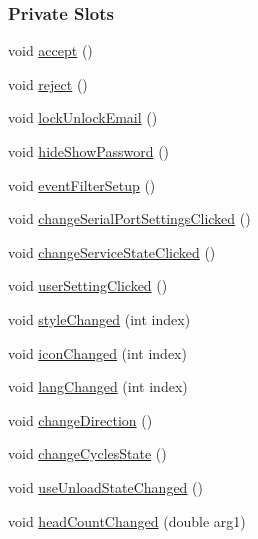 \subsubsection*{Private Slots}
\begin{DoxyCompactItemize}
\item 
void \mbox{\hyperlink{classGeneralSettingDialog_a8f189ce9494b6c5488f8a2be4c792f6a}{accept}} ()
\item 
void \mbox{\hyperlink{classGeneralSettingDialog_a2f4495a0f2911e41d3eaeec00949bde8}{reject}} ()
\item 
void \mbox{\hyperlink{classGeneralSettingDialog_a53e28908636048d815628b85dcaaca4c}{lock\+Unlock\+Email}} ()
\item 
void \mbox{\hyperlink{classGeneralSettingDialog_a15e7d8a20dbb83ea3ee46dd57446ec36}{hide\+Show\+Password}} ()
\item 
void \mbox{\hyperlink{classGeneralSettingDialog_aafd1047488eb1f024f0b572a95c454ad}{event\+Filter\+Setup}} ()
\item 
void \mbox{\hyperlink{classGeneralSettingDialog_afd7ce89c9dde6f411472da4e413475ec}{change\+Serial\+Port\+Settings\+Clicked}} ()
\item 
void \mbox{\hyperlink{classGeneralSettingDialog_ad5275b9ede5252e57d4b6a44eb771a04}{change\+Service\+State\+Clicked}} ()
\item 
void \mbox{\hyperlink{classGeneralSettingDialog_abfa33957c880ab0172b2ee30e848f6bd}{user\+Setting\+Clicked}} ()
\item 
void \mbox{\hyperlink{classGeneralSettingDialog_ac250bc3aba6c2e247d26f5ece4b32af7}{style\+Changed}} (int index)
\item 
void \mbox{\hyperlink{classGeneralSettingDialog_a6907e319fa3cedb66f4645cd0f3ad676}{icon\+Changed}} (int index)
\item 
void \mbox{\hyperlink{classGeneralSettingDialog_a80bce87bcafdf14692465fc5ae181a4c}{lang\+Changed}} (int index)
\item 
void \mbox{\hyperlink{classGeneralSettingDialog_a67274a86c828985ee88c055de4d2bce5}{change\+Direction}} ()
\item 
void \mbox{\hyperlink{classGeneralSettingDialog_aada0bfc2b43de3d88d705194362a769d}{change\+Cycles\+State}} ()
\item 
void \mbox{\hyperlink{classGeneralSettingDialog_acfb5eb53ac65d1aa5f037e88d91fa7e8}{use\+Unload\+State\+Changed}} ()
\item 
void \mbox{\hyperlink{classGeneralSettingDialog_ab986e75742799d02b8268d9743a422d6}{head\+Count\+Changed}} (double arg1)

\end{DoxyCompactItemize}
